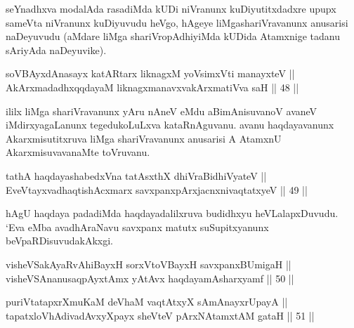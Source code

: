 \begin{artha}
seYnadhxva modalAda rasadiMda kUDi niVranunx kuDiyutitxdadxre upupx
sameVta niVranunx kuDiyuvudu heVgo, hAgeye liMgashariVravanunx
anusarisi naDeyuvudu (aMdare liMga shariVropAdhiyiMda kUDida Atamxnige
tadanu sAriyAda naDeyuvike).
\end{artha}


\begin{shl}
soV\s BAyxdAnasayx katAR\s tarx liknagxM yoV\s simxVti manayxteV || \\
AkArxmadadhxqqdayaM liknagxmanavxvakArxmatiVva saH \hfill || 48 ||  
\end{shl}

\begin{artha}
ililx liMga shariVravanunx yAru nAneV eMdu aBimAnisuvanoV avaneV
iMdirxyagaLanunx tegedukoLuLxva kataRnAguvanu. avanu haqdayavanunx
Akarxmisutitxruva liMga shariVravanunx anusarisi A AtamxnU
AkarxmisuvavanaMte toVruvanu.
\end{artha}


\begin{shl}
tathA haqdayashabedxVna tatAsxthX dhiVraBidhiVyateV || \\
EveVtayxvadhaqtishAcxmarx savxpanx\footnotemark[1]pArxjacnxnivaqtatxyeV \hfill || 49 ||  
\end{shl}

\begin{artha}
hAgU haqdaya padadiMda haqdayadalilxruva budidhxyu heVLalapxDuvudu. `Eva eMba avadhAraNavu savxpanx matutx suSupitxyanunx beVpaRDisuvudakAkxgi.
\end{artha}


\begin{shl}
visheVSakAyaRvAhiBayxH sorxVtoVBayxH savxpanxBUmigaH || \\
visheVSAnanusaqpAyx\s \s tAmx yAtAvx haqdayamAsharxyamf \hfill || 50 || 
\end{shl}

\begin{shl}
puriVtatapxrXmuKaM deVhaM vaqtAtxyX sAmAnayxrUpayA || \\
tapatxloVhAdivadAvxyXpayx sheVteV pArxNAtamxtAM gataH \hfill || 51 ||  
\end{shl}

